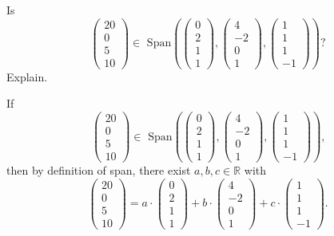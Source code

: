 \documentclass[12pt]{article}
\newenvironment{problem}[2][Problem]
{
	\begin{trivlist} 
		\item[\hskip \labelsep {\bfseries #1 #2:}]
	}
{
	\end{trivlist}
	}
\newenvironment{solution}[1][Solution]
{
	\begin{trivlist} 
		\item[\hskip \labelsep {\itshape #1:}]
	}
	{
	\end{trivlist}
}
\begin{document}
\newpage
\begin{problem}{3}
Is
\[
\begin{pmatrix} 20\\0\\5\\10\end{pmatrix} \in \text{ Span}\left( \begin{pmatrix} 0\\2\\1\\1 \end{pmatrix}, \begin{pmatrix} 4\\-2\\0\\1 \end{pmatrix}, \begin{pmatrix} 1\\1\\1\\-1 \end{pmatrix} \right) \text{?}
\]
Explain.
\noindent
\newline
\newline
\begin{solution}
If
\[
\begin{pmatrix} 20\\0\\5\\10\end{pmatrix} \in \text{ Span}\left( \begin{pmatrix} 0\\2\\1\\1 \end{pmatrix}, \begin{pmatrix} 4\\-2\\0\\1 \end{pmatrix}, \begin{pmatrix} 1\\1\\1\\-1 \end{pmatrix} \right) \text{,}
\]
then by definition of span, there exist $a,b,c \in \mathbb{R}$ with
\[
\begin{pmatrix} 20\\0\\5\\10\end{pmatrix}=a\cdot \begin{pmatrix} 0\\2\\1\\1 \end{pmatrix}+b\cdot \begin{pmatrix} 4\\-2\\0\\1 \end{pmatrix} + c\cdot \begin{pmatrix} 1\\1\\1\\-1 \end{pmatrix}\text{.}
\]
\end{solution}
\end{problem}
\end{document}

